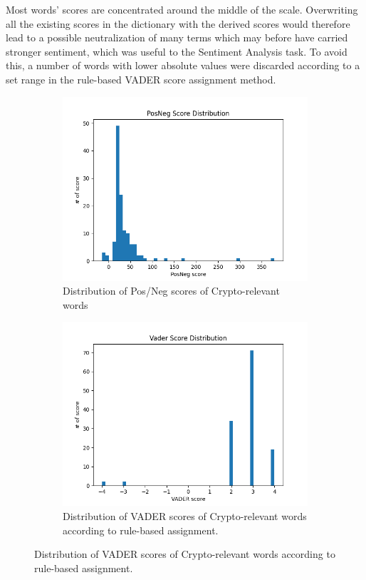 \documentclass[11pt]{article}
\begin{document}
Most words' scores are concentrated around the middle of the scale. Overwriting all the existing scores in the dictionary with the derived scores would therefore lead to a possible neutralization of many terms which may before have carried stronger sentiment, which was useful to the Sentiment Analysis task. To avoid this, a number of words with lower absolute values were discarded according to a set range in the rule-based VADER score assignment method. \\

\begin{figure}[H]
     \centering
     \begin{subfigure}[b]{0.45\textwidth}
         \centering
         \includegraphics[width=\textwidth]{figures/posneg_words_posneg_score.png}
         \caption{Distribution of Pos/Neg scores of Crypto-relevant words}
         \label{posneg_dist}
     \end{subfigure}
     \hfill 
     \begin{subfigure}[b]{0.45\textwidth}
         \centering
         \includegraphics[width=\textwidth]{figures/posneg_words_vader.png}
         \caption{Distribution of VADER scores of Crypto-relevant words according to rule-based assignment.}
         \label{vader_dist}
     \end{subfigure}
\end{figure}
\end{document}
